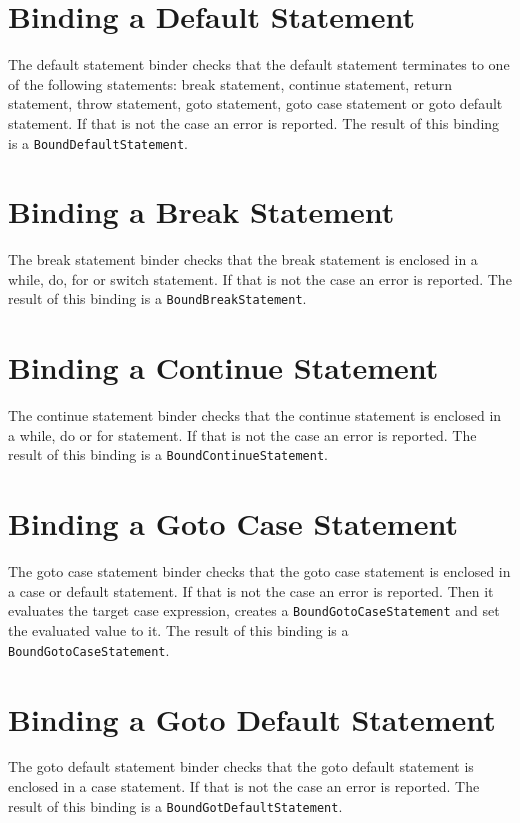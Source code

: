 \documentclass[a4paper,oneside,11pt]{book}
\theoremstyle{definition}
\begin{document}
\section{Binding a Default Statement}

The default statement binder checks that the default statement terminates to one of the following statements:
break statement, continue statement, return statement, throw statement, goto statement, goto case statement or goto default statement.
If that is not the case an error is reported.
The result of this binding is a \verb|BoundDefaultStatement|.

\section{Binding a Break Statement}

The break statement binder checks that the break statement is enclosed in a while, do, for or switch statement.
If that is not the case an error is reported.
The result of this binding is a \verb|BoundBreakStatement|.

\section{Binding a Continue Statement}

The continue statement binder checks that the continue statement is enclosed in a while, do or for statement.
If that is not the case an error is reported.
The result of this binding is a \verb|BoundContinueStatement|.

\section{Binding a Goto Case Statement}

The goto case statement binder checks that the goto case statement is enclosed in a case or default statement.
If that is not the case an error is reported.
Then it evaluates the target case expression, creates a \verb|BoundGotoCaseStatement| and set the evaluated value to it.
The result of this binding is a \verb|BoundGotoCaseStatement|.

\section{Binding a Goto Default Statement}

The goto default statement binder checks that the goto default statement is enclosed in a case statement.
If that is not the case an error is reported.
The result of this binding is a \verb|BoundGotDefaultStatement|.
\end{document}
